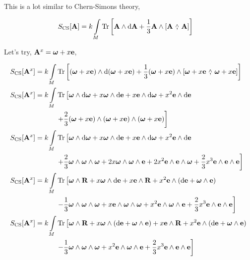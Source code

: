 This is a lot similar to Chern-Simons theory,

\begin{align*}
    S_{\textnormal{CS}}\qty[\vb A]&=k\int\limits_M\Tr\qty[\vb A\wedge\dd{\vb A}+\frac13\vb A\wedge\wedgecomm{\vb A}{\vb A}]
\end{align*}

Let's try, $\vb A^x=\boldsymbol\omega+x\vb e$,

\begin{align*}
    S_{\textnormal{CS}}\qty[\vb A^x]&=k\int\limits_M\Tr\qty[\qty(\boldsymbol\omega+x\vb e)\wedge\dd{\qty(\boldsymbol\omega+x\vb e)}+\frac13\qty(\boldsymbol\omega+x\vb e)\wedge\wedgecomm{\boldsymbol\omega+x\vb e}{\boldsymbol\omega+x\vb e}]\\
    S_{\textnormal{CS}}\qty[\vb A^x]&=k\int\limits_M\Tr\left[\boldsymbol\omega\wedge\dd{\boldsymbol\omega}+x\boldsymbol\omega\wedge\dd{\vb e}+x\vb e\wedge\dd{\boldsymbol\omega}+x^2\vb e\wedge\dd{\vb e}\right.\\
    &\quad\quad\quad\left.+\frac23\qty(\boldsymbol\omega+x\vb e)\wedge\qty(\boldsymbol\omega+x\vb e)\wedge\qty(\boldsymbol\omega+x\vb e)\right]\\
    S_{\textnormal{CS}}\qty[\vb A^x]&=k\int\limits_M\Tr\left[\boldsymbol\omega\wedge\dd{\boldsymbol\omega}+x\boldsymbol\omega\wedge\dd{\vb e}+x\vb e\wedge\dd{\boldsymbol\omega}+x^2\vb e\wedge\dd{\vb e}\right.\\
    &\quad\quad\quad\left.+\frac23\boldsymbol\omega\wedge\boldsymbol\omega\wedge\boldsymbol\omega+2x\boldsymbol\omega\wedge\boldsymbol\omega\wedge\vb e+2x^2\vb e\wedge\vb e\wedge \boldsymbol\omega+\frac23x^3\vb e\wedge\vb e\wedge\vb e\right]\\
    S_{\textnormal{CS}}\qty[\vb A^x]&=k\int\limits_M\Tr\left[\boldsymbol\omega\wedge\vb R+x\boldsymbol\omega\wedge\dd{\vb e}+x\vb e\wedge\vb R+x^2\vb e\wedge\qty(\dd{\vb e}+\boldsymbol\omega\wedge\vb e)\right.\\
    &\quad\quad\quad\left.-\frac13\boldsymbol\omega\wedge\boldsymbol\omega\wedge\boldsymbol\omega+x\vb e\wedge\boldsymbol\omega\wedge\boldsymbol\omega+x^2\vb e\wedge \boldsymbol\omega\wedge\vb e+\frac23x^3\vb e\wedge\vb e\wedge\vb e\right]\\
    S_{\textnormal{CS}}\qty[\vb A^x]&=k\int\limits_M\Tr\left[\boldsymbol\omega\wedge\vb R+x\boldsymbol\omega\wedge\qty(\dd{\vb e}+\boldsymbol\omega\wedge\vb e)+x\vb e\wedge\vb R+x^2\vb e\wedge\qty(\dd{\vb e}+\boldsymbol\omega\wedge\vb e)\right.\\
    &\quad\quad\quad\left.-\frac13\boldsymbol\omega\wedge\boldsymbol\omega\wedge\boldsymbol\omega+x^2\vb e\wedge \boldsymbol\omega\wedge\vb e+\frac23x^3\vb e\wedge\vb e\wedge\vb e\right]
\end{align*}

